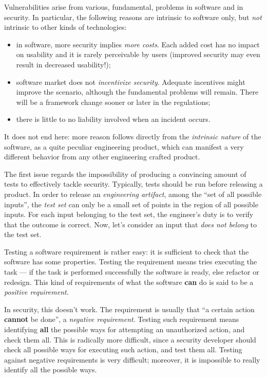 \documentclass[10pt]{extreport}
\begin{document}
Vulnerabilities arise from various, fundamental, problems in software and in
security. In particular, the following reasons are intrinsic to software only,
but \emph{not} intrinsic to other kinds of technologies:
\begin{itemize}
    \item in software, more security implies \emph{more costs}. Each added cost
        has no impact on usability and it is rarely perceivable by users
        (improved security may even result in decreased usability!);
    \item software market does not \emph{incentivize security}. Adequate
        incentives might improve the scenario, although the fundamental
        problems will remain. There will be a framework change sooner or later
        in the regulations;
    \item there is little to no liability involved when an incident occurs.
\end{itemize}

It does not end here: more reason follows directly from the \emph{intrinsic
nature} of the software, as a quite peculiar engineering product, which can
manifest a very different behavior from any other engineering crafted product.

The first issue regards the impossibility of producing a convincing amount of
tests to effectively tackle security. Typically, tests should be run before releasing a
product. In order to release an \emph{engineering artifact}, among the ``set of
all possible inputs'', the \emph{test set} can only be a small set of points in the
region of all possible inputs. For each input belonging to the test set, the
engineer's duty is to verify that the outcome is correct. Now, let's consider
an input that \emph{does not belong} to the test set.

Testing a software requirement is rather easy: it is sufficient to check that
the software has some properties. Testing the requirement means tries executing
the task --- if the task is performed successfully the software is ready, else
refactor or redesign. This kind of requirements of what the software
\textbf{can} do is said to be a \emph{positive requirement}.

In security, this doesn't work. The requirement is usually that ``a certain
action \textbf{cannot} be done'', a \emph{negative requirement}. Testing such
requirement means identifying \textbf{all} the possible ways for attempting an
unauthorized action, and check them all. This is radically more difficult,
since a security developer should check all possible ways for executing such
action, and test them all. Testing against negative requirements is very
difficult; moreover, it is impossible to really identify all the possible ways.
\end{document}
